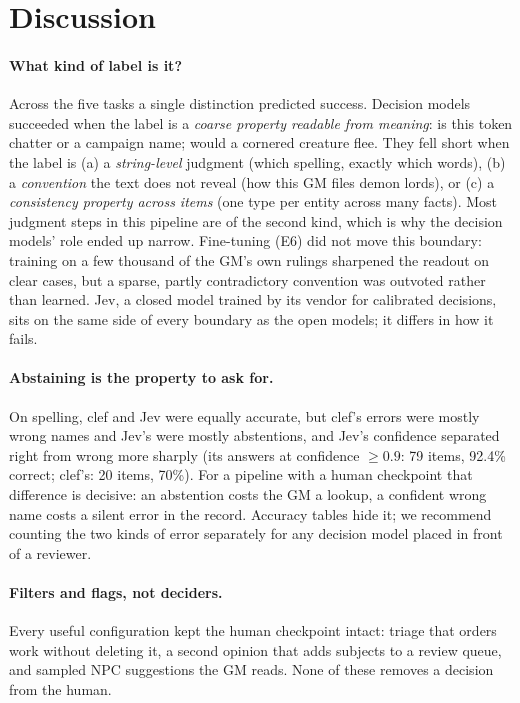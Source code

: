 \documentclass[11pt]{article}
\begin{document}
\section{Discussion}

\paragraph{What kind of label is it?} Across the five tasks a single distinction predicted success.
Decision models succeeded when the label is a \emph{coarse property readable from meaning}: is this
token chatter or a campaign name; would a cornered creature flee. They fell short when the label is
(a) a \emph{string-level} judgment (which spelling, exactly which words), (b) a \emph{convention}
the text does not reveal (how this GM files demon lords), or (c) a \emph{consistency property across
items} (one type per entity across many facts). Most judgment steps in this pipeline are of the second
kind, which is why the decision models' role ended up narrow. Fine-tuning (E6) did not move this
boundary: training on a few thousand of the GM's own rulings sharpened the readout on clear cases,
but a sparse, partly contradictory convention was outvoted rather than learned. Jev, a closed
model trained by its vendor for calibrated decisions, sits on the same side of every
boundary as the open models; it differs in how it fails.

\paragraph{Abstaining is the property to ask for.} On spelling, clef and Jev were equally accurate,
but clef's errors were mostly wrong names and Jev's were mostly abstentions, and Jev's
confidence separated right from wrong more sharply (its answers at confidence $\geq 0.9$: 79 items,
92.4\% correct; clef's: 20 items, 70\%). For a pipeline with a human
checkpoint that difference is decisive: an abstention costs the GM a lookup, a confident wrong name
costs a silent error in the record. Accuracy tables hide it; we recommend counting the two kinds of
error separately for any decision model placed in front of a reviewer.

\paragraph{Filters and flags, not deciders.} Every useful configuration kept the human checkpoint
intact: triage that orders work without deleting it, a second opinion that adds subjects to a review
queue, and sampled NPC suggestions the GM reads. None of these removes a decision from the human.
\end{document}
